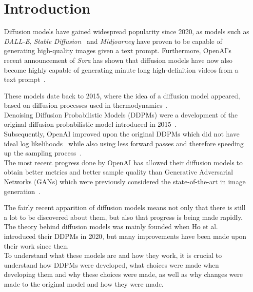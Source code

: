 \documentclass[twoside]{article}
\numberwithin{equation}{section}
\numberwithin{figure}{section}
\begin{document}
\newpage
\tableofcontents



\newpage
\section{Introduction}
Diffusion models have gained widespread popularity since 2020, as models such as \textit{DALL-E}, \textit{Stable Diffusion}~\cite{stablediffusion,rombach2022highresolution} and \textit{Midjourney} have proven to be capable of generating high-quality images given a text prompt. Furthermore, OpenAI's recent announcement of \textit{Sora} has shown that diffusion models have now also become highly capable of generating minute long high-definition videos from a text prompt~\cite{videoworldsimulators2024}.

These models date back to 2015, where the idea of a diffusion model appeared, based on diffusion processes used in thermodynamics~\cite{sohldickstein2015deep}. \\ 
Denoising Diffusion Probabilistic Models (DDPMs) were a development of the original diffusion probabilistic model introduced in 2015~\cite{ho2020denoising}. \\
Subsequently, OpenAI improved upon the original DDPMs which did not have ideal log likelihoods~\cite{ho2020denoising} while also using less forward passes and therefore speeding up the sampling process~\cite{nichol2021improved}. \\
The most recent progress done by OpenAI has allowed their diffusion models to obtain better metrics and better sample quality than Generative Adversarial Networks (GANs) which were previously considered the state-of-the-art in image generation~\cite{dhariwal2021diffusion}.

The fairly recent apparition of diffusion models means not only that there is still a lot to be discovered about them, but also that progress is being made rapidly. \\
The theory behind diffusion models was mainly founded when Ho et al.~\cite{ho2020denoising} introduced their DDPMs in 2020, but many improvements have been made upon their work since then. \\ 
To understand what these models are and how they work, it is crucial to understand how DDPMs were developed, what choices were made when developing them and why these choices were made, as well as why changes were made to the original model and how they were made.
\end{document}
